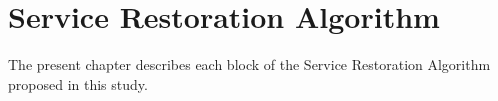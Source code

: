 \chapter{Service Restoration Algorithm}
\label{ch1}

The present chapter describes each block of the Service Restoration Algorithm proposed in this study. 






